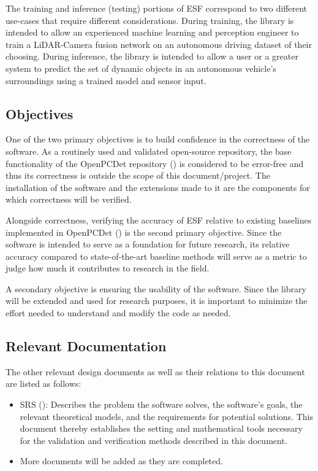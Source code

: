 \documentclass[12pt, titlepage]{article}
\newcommand{\ProjectName}{ESF }
\begin{document}
The training and inference (testing) portions of \ProjectName{}correspond to two different use-cases 
that require different considerations. During training, the library is intended to allow an experienced
machine learning and perception engineer to train a LiDAR-Camera fusion network on an autonomous driving 
dataset of their choosing. During inference, the library is intended to allow a user or a greater system 
to predict the set of dynamic objects in an autonomous vehicle's surroundings using a trained model and 
sensor input.

\subsection{Objectives}

One of the two primary objectives is to build confidence in the correctness of the software.
As a routinely used and validated open-source repository, the base functionality of the OpenPCDet
repository (\cite{openpcdet2020}) is considered to be error-free and thus its correctness is outside the scope of this document/project.
The installation of the software and the extensions made to it are the components for which correctness will be 
verified. 

Alongside correctness, verifying the accuracy of \ProjectName{}relative to existing baselines implemented in 
OpenPCDet (\cite{openpcdet2020}) is the second primary objective. Since the software is intended to serve as a foundation
for future research, its relative accuracy compared to state-of-the-art baseline methods will serve 
as a metric to judge how much it contributes to research in the field.

A secondary objective is ensuring the usability of the software. Since the library will be extended and
used for research purposes, it is important to minimize the effort needed to understand and modify the code
as needed. 

\subsection{Relevant Documentation}

The other relevant design documents as well as their relations to this document are listed as follows:

\begin{itemize}
  \item SRS (\cite{SRS}): Describes the problem the software solves, the software's goals, 
  the relevant theoretical models, and the requirements for potential solutions. This document 
  thereby establishes the setting and mathematical tools necessary for the validation and verification
  methods described in this document.
  \item More documents will be added as they are completed.
\end{itemize}
\end{document}
